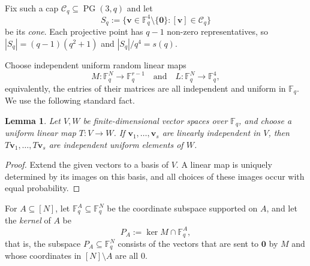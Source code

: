 \documentclass[12pt,a4paper]{article}
\numberwithin{equation}{section}
\newtheorem{lemma}[theorem]{Lemma}
\theoremstyle{definition}
\theoremstyle{remark}
\newcommand{\hide}[1]{{\color{DarkGreen}#1}}
\renewcommand{\hide}[1]{}
\newcommand{\V}[1]{\boldsymbol{#1}}
\renewcommand{\longrightarrow}{\to}
\begin{document}
\hide{
\begin{proof}
    Let $K:=\mathbb F_{q^2}$, identify $\mathbb F_q^4$ with $\mathbb F_q\times\mathbb F_q\times K$, and write $\operatorname{Nm}(z):=z^{q+1}$ for the norm from $K$ to $\mathbb F_q$. Put
    \[
    \mathcal C_q:=\{[(1,\operatorname{Nm}(z),z)]:z\in K\}\cup\{[(0,1,0)]\}.
    \]
    These are $q^2+1$ distinct points, all represented by zeros of the quadratic form $Q(a,b,z):=ab-\operatorname{Nm}(z)$. If $\V{u}=(1,\operatorname{Nm}(z),z)$ and $\V{v}=(1,\operatorname{Nm}(w),w)$, then expansion of the norm gives
    \[
    Q(s\V{u}+t\V{v})=st\operatorname{Nm}(z-w)
    \quad(s,t\in\mathbb F_q).
    \]
    For $z\ne w$, the norm on the right is non-zero, so the line through $[\V{u}]$ and $[\V{v}]$ contains no other zero of $Q$. If instead $\V{u}=(0,1,0)$ and $\V{v}=(1,\operatorname{Nm}(z),z)$, the corresponding identity is $Q(s\V{u}+t\V{v})=st$, with the same conclusion. Thus no three points of $\mathcal C_q$ are collinear.
\end{proof}
}

Fix such a cap  $\mathcal C_q\subseteq\operatorname{PG}(3,q)$ and let
\[
S_q:=\{\V{v}\in\mathbb F_q^4\setminus\{\V{0}\}:[\V{v}]\in\mathcal C_q\}
\]
be its \emph{cone}. Each projective point has $q-1$ non-zero representatives, so $|S_q|=(q-1)(q^2+1)$ and $|S_q|/q^4=s(q)$.

Choose independent uniform random linear maps
\[
M:\mathbb F_q^N\longrightarrow\mathbb F_q^{r-1}\quad\text{and}\quad
L:\mathbb F_q^N\longrightarrow\mathbb F_q^4,
\]
equivalently, the entries of their matrices are all independent and uniform in $\mathbb F_q$. We use the following standard fact.

\begin{lemma}\label{lem:uniform}
    Let $V,W$ be finite-dimensional vector spaces over $\mathbb F_q$, and choose a uniform linear map $T:V\to W$. If $\V{v}_1,\ldots,\V{v}_s$ are linearly independent in $V$, then $T\V{v}_1,\ldots,T\V{v}_s$ are independent uniform elements of $W$.
\end{lemma}

\begin{proof}
    Extend the given vectors to a basis of $V$. A linear map is uniquely determined by its images on this basis, and all choices of these images occur with equal probability.
\end{proof}

For $A\subseteq[N]$, let $\mathbb F_q^A\subseteq\mathbb F_q^N$ be the coordinate subspace supported on $A$, and let the \emph{kernel} of $A$ be
\[
P_A:=\ker M\cap\mathbb F_q^A,
\]
 that is, the subspace $P_A\subseteq \mathbb F_q^N$ consists of the vectors that are sent to $\V{0}$ by $M$  and whose coordinates in $[N]\setminus A$ are all $0$.
\end{document}
